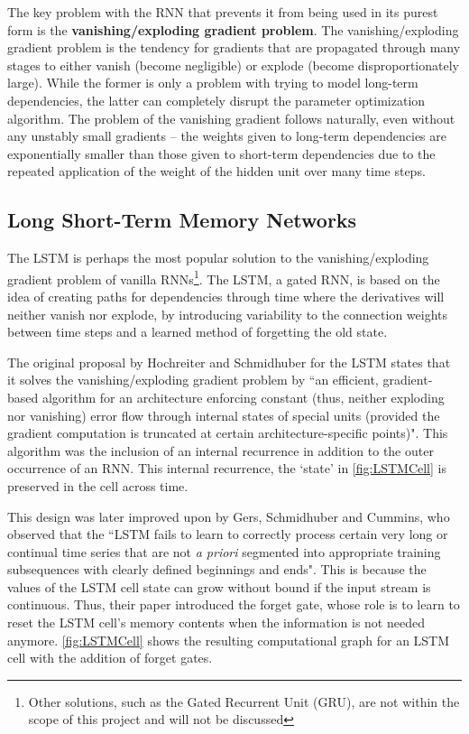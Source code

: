 \documentclass[12pt,a4paper,twoside,openright]{report}
\begin{document}
The key problem with the RNN that prevents it from being used in its purest form is the
\textbf{vanishing/exploding gradient problem}. The vanishing/exploding gradient problem
is the tendency for gradients that are propagated through many stages
to either vanish (become negligible) or explode (become disproportionately large). While the
former is only a problem with trying to model long-term dependencies, the latter can completely
disrupt the parameter optimization algorithm. The problem of the vanishing gradient follows naturally,
even without any unstably small gradients -- the weights given to long-term dependencies are
exponentially smaller than those given to short-term dependencies due to the repeated application
of the weight of the hidden unit over many time steps.

\subsection{Long Short-Term Memory Networks}
\label{sec:introLSTM}

The LSTM is perhaps the most popular solution to the vanishing/exploding
gradient problem of vanilla RNNs\footnote{Other solutions, such as the Gated Recurrent Unit (GRU), are
not within the scope of this project and will not be discussed}. The LSTM, a gated RNN, is based on the
idea of creating paths for dependencies through time where the derivatives will neither vanish
nor explode, by introducing variability to the connection weights between time steps and a learned
method of forgetting the old state.

The original proposal by Hochreiter and Schmidhuber for the LSTM states that it solves the
vanishing/exploding gradient problem by ``an efficient, gradient-based algorithm for
an architecture enforcing constant (thus, neither exploding nor vanishing)
error flow through internal states of special units (provided the gradient
computation is truncated at certain architecture-specific points)"\cite{Hochreiter97}.
This algorithm was the inclusion of an internal recurrence in addition to the outer
occurrence of an RNN. This internal recurrence, the `state' in \cref{fig:LSTMCell}
is preserved in the cell across time.

This design was later improved upon by Gers, Schmidhuber and Cummins,
who observed that the ``LSTM fails to learn to correctly process certain
very long or continual time series that are not \textit{a priori} segmented into 
appropriate training subsequences with clearly defined beginnings and ends"\cite{Gers99}.
This is because the values of the LSTM cell state can grow without bound if the
input stream is continuous. Thus, their paper introduced the forget gate,
whose role is to learn to reset the LSTM cell's memory contents when
the information is not needed anymore. \cref{fig:LSTMCell} shows
the resulting computational graph for an LSTM cell with the addition of forget gates.
\end{document}
